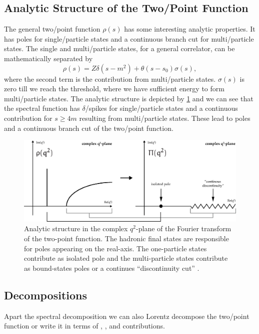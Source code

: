 \documentclass[../../index.tex]{subfiles}
\begin{document}
\subsection{Analytic Structure of the Two\-/Point Function}
The general two\-/point function $\rho(s)$ has some interesting analytic properties. It has poles for single\-/particle states and a continuous
branch cut for multi\-/particle states. The single and multi\-/particle states,
for a general correlator, can be mathematically separated by
\begin{equation}
  \rho(s) = Z \delta(s-m^2) + \theta(s-s_0)\sigma(s),
\end{equation}
where the second term is the contribution from multi\-/particle states.
\(\sigma(s)\) is zero till we reach the threshold, where we have sufficient
energy to form multi\-/particle states. The analytic structure is depicted by
\cref{fig:analyticStructureCorrelator} and we can see that the spectral function
has \(\delta\)\-/spikes for single\-/particle states and a continuous
contribution for \(s\geq 4m\) resulting from multi\-/particle states. These lead
to poles and a continuous branch cut of the two\-/point function.
\begin{figure}
  \centering
  \includegraphics[width=\textwidth]{./images/analyticStructureCorrelator.eps}
  \caption{Analytic structure in the complex $q^2$-plane of the Fourier
    transform of the two-point function. The hadronic final states are
    responsible for poles appearing on the real-axis. The one-particle states
    contribute as isolated pole and the multi-particle states contribute as
    bound-states poles or a continues ``discontinuity cut''
    \cite{Peskin1995,Zwicky2016}.}
  \label{fig:analyticStructureCorrelator}
\end{figure}

\subsection{Decompositions}
Apart the spectral decomposition we can also Lorentz decompose the two\-/point
function or write it in terms of , ,
 and  contributions.
\end{document}
